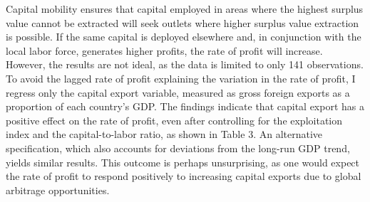 \documentclass[10pt]{article}
\begin{document}
\par Capital mobility ensures that capital employed in areas where the highest surplus value cannot be extracted will seek outlets where higher surplus value extraction is possible. If the same capital is deployed elsewhere and, in conjunction with the local labor force, generates higher profits, the rate of profit will increase. However, the results are not ideal, as the data is limited to only 141 observations. To avoid the lagged rate of profit explaining the variation in the rate of profit, I regress only the capital export variable, measured as gross foreign exports as a proportion of each country's GDP. The findings indicate that capital export has a positive effect on the rate of profit, even after controlling for the exploitation index and the capital-to-labor ratio, as shown in Table 3. An alternative specification, which also accounts for deviations from the long-run GDP trend, yields similar results. This outcome is perhaps unsurprising, as one would expect the rate of profit to respond positively to increasing capital exports due to global arbitrage opportunities. 
\end{document}
